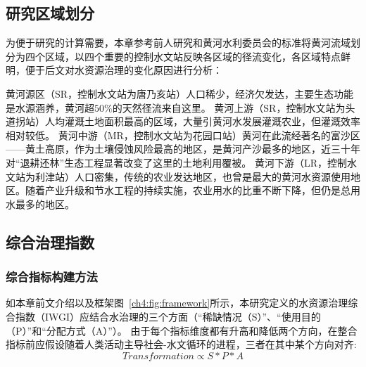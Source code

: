 \subsection{研究区域划分}\label{ch4:sec:region}

为便于研究的计算需要，本章参考前人研究和黄河水利委员会的标准将黄河流域划分为四个区域\cite{shuilibuhuangheshuiliweiyuanhui,wang2019c,wang2016e}，以四个重要的控制水文站反映各区域的径流变化，各区域特点鲜明，便于后文对水资源治理的变化原因进行分析：

黄河源区（SR，控制水文站为唐乃亥站）人口稀少，经济欠发达，主要生态功能是水源涵养，黄河超$50\%$的天然径流来自这里。
黄河上游（SR，控制水文站为头道拐站）人均灌溉土地面积最高的区域，大量引黄河水发展灌溉农业，但灌溉效率相对较低。
黄河中游（MR，控制水文站为花园口站）黄河在此流经著名的富沙区——黄土高原，作为土壤侵蚀风险最高的地区，是黄河产沙最多的地区，近三十年对“退耕还林”生态工程显著改变了这里的土地利用覆被。
黄河下游（LR，控制水文站为利津站）人口密集，传统的农业发达地区，也曾是最大的黄河水资源使用地区。随着产业升级和节水工程的持续实施，农业用水的比重不断下降，但仍是总用水最多的地区。



\subsection{综合治理指数}

\subsubsection{综合指标构建方法}

如本章前文介绍以及框架图~\ref{ch4:fig:framework}所示，本研究定义的水资源治理综合指数（IWGI）应结合水治理的三个方面（“稀缺情况（S）”、“使用目的（P）”和“分配方式（A）”）。
由于每个指标维度都有升高和降低两个方向，在整合指标前应假设随着人类活动主导社会-水文循环的进程，三者在其中某个方向对齐:
\begin{equation}
    Transformation \propto S*P*A
\end{equation}

